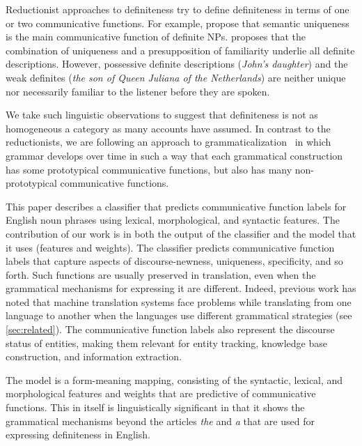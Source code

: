 \documentclass[11pt,letterpaper]{article}
\begin{document}
Reductionist approaches to definiteness try to define definiteness in terms of one or two communicative functions.   
For example, \citet{kadmon87,evans80} propose that semantic uniqueness is the main communicative function of definite NPs.  
\citet{roberts03} proposes that the combination of uniqueness and a presupposition of familiarity 
underlie all definite descriptions.  However, possessive definite descriptions ({\it John's daughter}) 
and the weak definites ({\it the son of Queen Juliana of the Netherlands}) are neither unique nor necessarily 
familiar to the listener before they are spoken.  

We take such linguistic observations to suggest that definiteness is not as homogeneous a category 
as many accounts have assumed.  In contrast to the reductionists, we are following an 
approach to grammaticalization~\citep{hopper-03} in which grammar develops over time in such a way that 
each grammatical construction has some prototypical communicative functions, 
but also has many non-prototypical communicative functions.  

This paper describes a classifier that predicts communicative function labels for English noun phrases  
using lexical, morphological, and syntactic features.   
The contribution of our work is in both the output of the classifier and the model that it uses (features and weights).  
The classifier predicts communicative function labels that capture aspects of discourse-newness, uniqueness, specificity, and so forth. %
Such functions are usually preserved in translation, even when the grammatical mechanisms 
for expressing it are different. 
Indeed, previous work has noted that machine translation systems face problems 
while translating from one language to another when the languages use different grammatical strategies (see \cref{sec:related}).
The communicative function labels also represent the discourse status of entities, 
making them relevant for entity tracking, knowledge base construction, and information extraction. 

The model is a form-meaning mapping, consisting of the syntactic, lexical, and morphological features 
and weights that are predictive of communicative functions.   
This in itself is linguistically significant in that it shows the grammatical mechanisms 
beyond the articles {\em the} and {\em a} that are used for expressing definiteness in English.   
\end{document}
